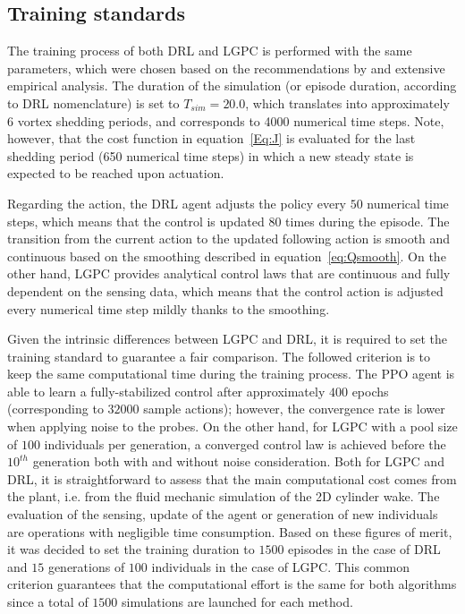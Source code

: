 \subsection{Training standards}
The training process of both DRL and LGPC is performed with the same parameters, which were chosen based on the recommendations by \citet{rabault2019JFM} and extensive empirical analysis. The duration of the simulation (or episode duration, according to DRL nomenclature) is set to $T_{sim} = 20.0$, which translates into approximately 6 vortex shedding periods, and corresponds to 4000 numerical time steps. Note, however, that the cost function in equation~\ref{Eq:J} is evaluated for the last shedding period (650 numerical time steps) in which a new steady state is expected to be reached upon actuation.

Regarding the action, the DRL agent adjusts the policy every $50$ numerical time steps, which means that the control is updated $80$ times during the episode. The transition from the current action to the updated following action is smooth and continuous based on the smoothing described in equation~\ref{eq:Qsmooth}. On the other hand, LGPC provides analytical control laws that are continuous and fully dependent on the sensing data, which means that the control action is adjusted every numerical time step mildly thanks to the smoothing.

Given the intrinsic differences between LGPC and DRL, it is required to set the training standard to guarantee a fair comparison. The followed criterion is to keep the same computational time during the training process. The PPO agent is able to learn a fully-stabilized control after approximately $400$ epochs (corresponding to $32000$ sample actions); however, the convergence rate is lower when applying noise to the probes. On the other hand, for LGPC with a pool size of $100$ individuals per generation, a converged control law is achieved before the $10^{th}$ generation both with and without noise consideration. Both for LGPC and DRL, it is straightforward to assess that the main computational cost comes from the plant, i.e. from the fluid mechanic simulation of the 2D cylinder wake. The evaluation of the sensing, update of the agent or generation of new individuals are operations with negligible time consumption. Based on these figures of merit, it was decided to set the training duration to $1500$ episodes in the case of DRL and $15$ generations of $100$ individuals in the case of LGPC. This common criterion guarantees that the computational effort is the same for both algorithms since a total of $1500$ simulations are launched for each method.

